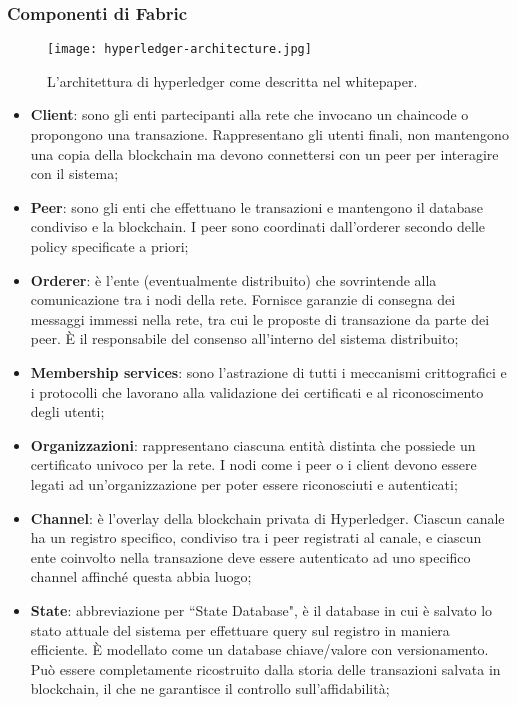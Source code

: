 		\subsubsection{Componenti di Fabric}
			\begin{figure}[ht]
				\centering
				\texttt{[image: hyperledger-architecture.jpg]}
				\caption[L'architettura di hyperledger come descritta nel whitepaper]{L'architettura di hyperledger come descritta nel whitepaper.}
				\label{fig:hyperledger_architecture}
			\end{figure}
			\begin{itemize}
				\item \textbf{Client}: sono gli enti partecipanti alla rete che invocano un chaincode o propongono una transazione. Rappresentano gli utenti finali, non mantengono una copia della blockchain ma devono connettersi con un peer per interagire con il sistema;
				\item \textbf{Peer}: sono gli enti che effettuano le transazioni e mantengono il database condiviso e la blockchain. I peer sono coordinati dall'orderer secondo delle policy specificate a priori;
				\item \textbf{Orderer}: è l'ente (eventualmente distribuito) che sovrintende alla comunicazione tra i nodi della rete. Fornisce garanzie di consegna dei messaggi immessi nella rete, tra cui le proposte di transazione da parte dei peer. È il responsabile del consenso all'interno del sistema distribuito;
				\item \textbf{Membership services}: sono l'astrazione di tutti i meccanismi crittografici e i protocolli che lavorano alla validazione dei certificati e al riconoscimento degli utenti; 
				\item \textbf{Organizzazioni}: rappresentano ciascuna entità distinta che possiede un certificato univoco per la rete. I nodi come i peer o i client devono essere legati ad un'organizzazione per poter essere riconosciuti e autenticati;
				\item \textbf{Channel}: è l'overlay della blockchain privata di Hyperledger. Ciascun canale ha un registro specifico, condiviso tra i peer registrati al canale, e ciascun ente coinvolto nella transazione deve essere autenticato ad uno specifico channel affinché questa abbia luogo;
				\item \textbf{State}: abbreviazione per ``State Database", è il database in cui è salvato lo stato attuale del sistema per effettuare query sul registro in maniera efficiente. È modellato come un database chiave/valore con versionamento. Può essere completamente ricostruito dalla storia delle transazioni salvata in blockchain, il che ne garantisce il controllo sull'affidabilità;

\end{itemize}
